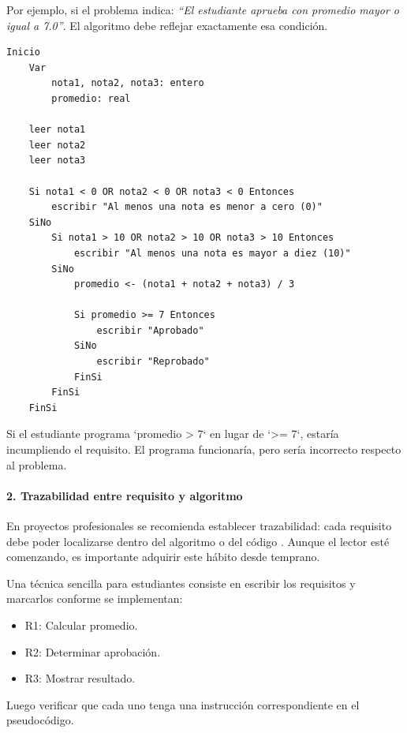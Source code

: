 \documentclass[12pt,twoside]{book}
\begin{document}
						\noindent
						Por ejemplo, si el problema indica: \textit{“El estudiante aprueba con promedio mayor o igual a 7.0”}. El algoritmo debe reflejar exactamente esa condición.
						
						\begin{lstlisting}[style=upsamStyle, caption={Validación directa del requisito de aprobación.}, label={lst:ValidacionAprobacion}, basicstyle=\small\ttfamily]
	Inicio
	Var
		nota1, nota2, nota3: entero
		promedio: real
	
	leer nota1
	leer nota2
	leer nota3
	
	Si nota1 < 0 OR nota2 < 0 OR nota3 < 0 Entonces
		escribir "Al menos una nota es menor a cero (0)"
	SiNo
		Si nota1 > 10 OR nota2 > 10 OR nota3 > 10 Entonces
			escribir "Al menos una nota es mayor a diez (10)"
		SiNo
			promedio <- (nota1 + nota2 + nota3) / 3
			
			Si promedio >= 7 Entonces
				escribir "Aprobado"
			SiNo
				escribir "Reprobado"
			FinSi
		FinSi 
	FinSi \end{lstlisting}
						
						Si el estudiante programa `promedio > 7` en lugar de `>= 7`, estaría incumpliendo el requisito. El programa funcionaría, pero sería incorrecto respecto al problema.
						
						\paragraph{2. Trazabilidad entre requisito y algoritmo}
						
						En proyectos profesionales se recomienda establecer trazabilidad: cada requisito debe poder localizarse dentro del algoritmo o del código \cite{SWEBOK2025Guide}. Aunque el lector esté comenzando, es importante adquirir este hábito desde temprano.
						
						Una técnica sencilla para estudiantes consiste en escribir los requisitos y marcarlos conforme se implementan:
						
						\begin{itemize}
							\item R1: Calcular promedio.
							\item R2: Determinar aprobación.
							\item R3: Mostrar resultado.
						\end{itemize}
						
						Luego verificar que cada uno tenga una instrucción correspondiente en el pseudocódigo.
						
\end{document}
